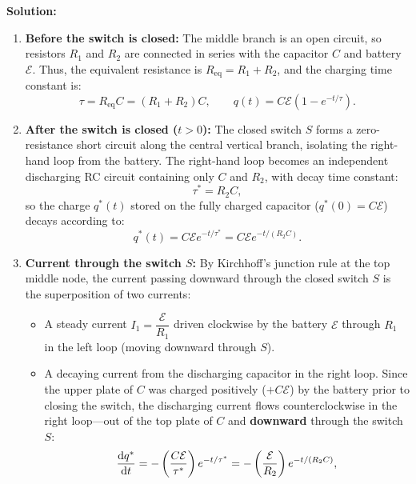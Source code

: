 \begin{example}
\textbf{Solution:}
\begin{enumerate}
    \item[(a)] \textbf{Before the switch is closed:} The middle branch is an open circuit, so resistors $R_1$ and $R_2$ are connected in series with the capacitor $C$ and battery $\mathcal{E}$. Thus, the equivalent resistance is $R_{\text{eq}} = R_1 + R_2$, and the charging time constant is:
    \begin{equation}
        \tau = R_{\text{eq}} C = (R_1 + R_2) C, \qquad q(t) = C\mathcal{E}\left(1 - e^{-t/\tau}\right).
    \end{equation}
    \item[(b)] \textbf{After the switch is closed ($t > 0$):} The closed switch $S$ forms a zero-resistance short circuit along the central vertical branch, isolating the right-hand loop from the battery. The right-hand loop becomes an independent discharging RC circuit containing only $C$ and $R_2$, with decay time constant:
    \begin{equation}
        \tau^* = R_2 C,
    \end{equation}
    so the charge $q^*(t)$ stored on the fully charged capacitor ($q^*(0) = C\mathcal{E}$) decays according to:
    \begin{equation}
        q^*(t) = C\mathcal{E} e^{-t / \tau^*} = C\mathcal{E} e^{-t / (R_2 C)}.
    \end{equation}
    \item[(c)] \textbf{Current through the switch $S$:} By Kirchhoff's junction rule at the top middle node, the current passing downward through the closed switch $S$ is the superposition of two currents:
    \begin{itemize}
        \item A steady current $I_1 = \dfrac{\mathcal{E}}{R_1}$ driven clockwise by the battery $\mathcal{E}$ through $R_1$ in the left loop (moving downward through $S$).
        \item A decaying current from the discharging capacitor in the right loop. Since the upper plate of $C$ was charged positively ($+C\mathcal{E}$) by the battery prior to closing the switch, the discharging current flows counterclockwise in the right loop—out of the top plate of $C$ and \textbf{downward} through the switch $S$:
        \begin{equation*}
            \dv{q^*}{t} = -\left(\frac{C\mathcal{E}}{\tau^*}\right) e^{-t / \tau^*} = -\left(\frac{\mathcal{E}}{R_2}\right) e^{-t / (R_2 C)},
        \end{equation*}

\end{itemize}
\end{enumerate}
\end{example}
